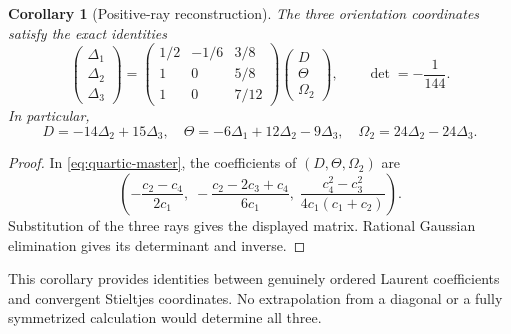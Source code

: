 \documentclass[11pt]{article}
\numberwithin{equation}{section}
\newtheorem{corollary}[theorem]{Corollary}
\theoremstyle{definition}
\begin{document}
\begin{corollary}[Positive-ray reconstruction]\label{cor:three-rays}
The three orientation coordinates satisfy the exact identities
\begin{equation}\label{eq:three-rays}
 \begin{pmatrix}\Delta_1\\\Delta_2\\\Delta_3\end{pmatrix}
 =\begin{pmatrix}1/2&-1/6&3/8\\1&0&5/8\\1&0&7/12\end{pmatrix}
 \begin{pmatrix}D\\\Theta\\\Omega_2\end{pmatrix},
 \qquad \det=-\frac1{144}.
\end{equation}
In particular,
\begin{equation}\label{eq:ray-inverse}
 \boxed{\quad
 D=-14\Delta_2+15\Delta_3,\quad
 \Theta=-6\Delta_1+12\Delta_2-9\Delta_3,\quad
 \Omega_2=24\Delta_2-24\Delta_3.\quad}
\end{equation}
\end{corollary}
\begin{proof}
In \eqref{eq:quartic-master}, the coefficients of $(D,\Theta,\Omega_2)$
are
\[
 \left(-\frac{c_2-c_4}{2c_1},\;
       -\frac{c_2-2c_3+c_4}{6c_1},\;
        \frac{c_4^2-c_3^2}{4c_1(c_1+c_2)}\right).
\]
Substitution of the three rays gives the displayed matrix. Rational
Gaussian elimination gives its determinant and inverse.
\end{proof}

This corollary provides identities between genuinely ordered Laurent
coefficients and convergent Stieltjes coordinates. No extrapolation from
a diagonal or a fully symmetrized calculation would determine all three.
\end{document}
